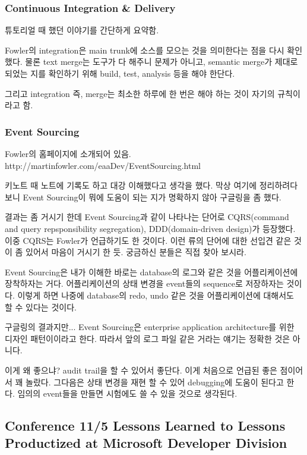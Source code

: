 \documentclass[a4paper]{article}
\begin{document}
\subsubsection{Continuous Integration \& Delivery}
 
튜토리얼 때 했던 이야기를 간단하게 요약함. 
 
Fowler의 integration은 main trunk에 소스를 모으는 것을 의미한다는 점을
다시 확인했다.  물론 text merge는 도구가 다 해주니 문제가 아니고,
semantic merge가 제대로 되었는 지를 확인하기 위해 build, test,
analysis 등을 해야 한단다.
 
그리고 integration 즉, merge는 최소한 하루에 한 번은 해야 하는 것이
자기의 규칙이라고 함.
 
\subsubsection{Event Sourcing}
 
Fowler의 홈페이지에 소개되어 있음.
http://martinfowler.com/eaaDev/EventSourcing.html
 
키노트 때 노트에 기록도 하고 대강 이해했다고 생각을 했다. 막상 여기에
정리하려다 보니 Event Sourcing이 뭐에 도움이 되는 지가 명확하지 않아
구글링을 좀 했다.
 
결과는 좀 거시기 한데 Event Sourcing과 같이 나타나는 단어로
CQRS(command and query repsponsibility segregation), DDD(domain-driven
design)가 등장했다. 이중 CQRS는 Fowler가 언급하기도 한 것이다. 이런
류의 단어에 대한 선입견 같은 것이 좀 있어서 마음이 거시기 한
듯. 궁금하신 분들은 직접 찾아 보시라.
 
Event Sourcing은 내가 이해한 바로는 database의 로그와 같은 것을
어플리케이션에 장착하자는 거다. 어플리케이션의 상태 변경을 event들의
sequence로 저장하자는 것이다. 이렇게 하면 나중에 database의 redo, undo
같은 것을 어플리케이션에 대해서도 할 수 있다는 것이다.
 
구글링의 결과지만... Event Sourcing은 enterprise application
architecture를 위한 디자인 패턴이이라고 한다. 따라서 앞의 로그 파일
같은 거라는 얘기는 정확한 것은 아니다.
 
이게 왜 좋으냐? audit trail을 할 수 있어서 좋단다. 이게 처음으로 언급된
좋은 점이어서 꽤 놀랐다. 그다음은 상태 변경을 재현 할 수 있어
debugging에 도움이 된다고 한다.  임의의 event들을 만들면 시험에도 쓸 수
있을 것으로 생각된다.

\subsection{Conference 11/5 Lessons Learned to Lessons Productized at
  Microsoft Developer Division}
 
\end{document}
